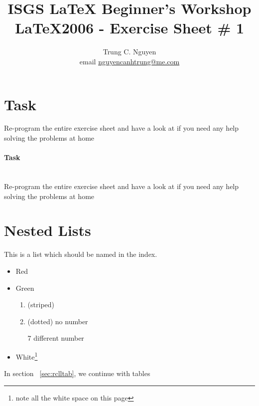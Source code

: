 \documentclass[a4paper, 10pt]{article}
\title{ISGS \LaTeX { }Beginner's Workshop 
		\\ \LaTeX 2006 - Exercise Sheet \# 1 }
\author{Trung C. Nguyen 
			\\ email \href{mailto:nguyencanhtrung@me.com}{nguyencanhtrung@me.com} }
\begin{document}
	\maketitle
	\tableofcontents
	
	\newpage
	\listoftodos
	
	\newpage
	
	\section*{Task}  %
	Re-program the entire exercise sheet and have a look at \cite{wikibook} if you need any help solving the problems at home
	
	\paragraph{Task} \hspace{0pt} \\           %
	Re-program the entire exercise sheet and have a look at \cite{wikibook} if you need any help solving the problems at home
	\section{Nested Lists}
	This is a list which should be named in the index.
		\begin{itemize}
			\item Red
			\item Green
				\begin{enumerate}
					\item (striped)
					\item (dotted) \linebreak
					 		  no number
					\item[7] different number
				\end{enumerate}
			\item White\footnote{note all the white space on this page}
		\end{itemize}
	In section ~\ref{sec:rclltab}, we continue with tables		
	
	\newpage
\end{document}

